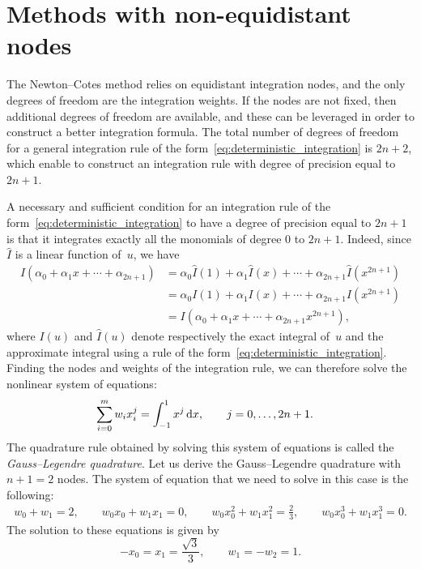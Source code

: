 \section{Methods with non-equidistant nodes}
The Newton--Cotes method relies on equidistant integration nodes,
and the only degrees of freedom are the integration weights.
If the nodes are not fixed,
then additional degrees of freedom are available,
and these can be leveraged in order to construct a better integration formula.
The total number of degrees of freedom for a general integration rule of the form~\eqref{eq:deterministic_integration} is $2n + 2$,
which enable to construct an integration rule with degree of precision equal to~$2n+1$.

A necessary and sufficient condition for an integration rule of the form~\eqref{eq:deterministic_integration} to have a degree of precision
equal to $2n +1$ is that it integrates exactly all the monomials of degree $0$ to $2n+1$.
Indeed, since $\widehat I$ is a linear function of~$u$,
we have
\begin{align*}
    \widehat I(\alpha_0 + \alpha_1 x + \dotsb + \alpha_{2n+1})
    &= \alpha_0 \widehat I(1) + \alpha_1 \widehat I(x) + \dotsb + \alpha_{2n+1} \widehat I(x^{2n+1}) \\
    &= \alpha_0 I(1) + \alpha_1 I(x) + \dotsb + \alpha_{2n+1} I(x^{2n+1}) \\
    &= I(\alpha_0 + \alpha_1 x + \dotsb + \alpha_{2n+1} x^{2n+1}),
\end{align*}
where $I(u)$ and $\widehat I(u)$ denote respectively the exact integral of~$u$ and the approximate integral using a rule of the form~\eqref{eq:deterministic_integration}.
Finding the nodes and weights of the integration rule,
we can therefore solve the nonlinear system of equations:
\begin{align}
    \label{eq:system_gauss_legendre}
    \sum_{i=0}^{m} w_i x_i^{j} &= \int_{-1}^{1} x^j \, \mathrm d x, \qquad j = 0, \dotsc, 2n+1.
\end{align}
The quadrature rule obtained by solving this system of equations is called the \emph{Gauss--Legendre quadrature}.
Let us derive the Gauss--Legendre quadrature with $n + 1 = 2$ nodes.
The system of equation that we need to solve in this case is the following:
\begin{align*}
    w_0 + w_1 = 2,
    \qquad w_0 x_0 + w_1 x_1 = 0,
    \qquad w_0 x_0^2 + w_1 x_1^2 = \frac{2}{3},
    \qquad w_0 x_0^3 + w_1 x_1^3 = 0.
\end{align*}
The solution to these equations is given by
\[
    - x_0 = x_1 = \frac{\sqrt{3}}{3}, \qquad w_1 = - w_2 = 1.
\]

